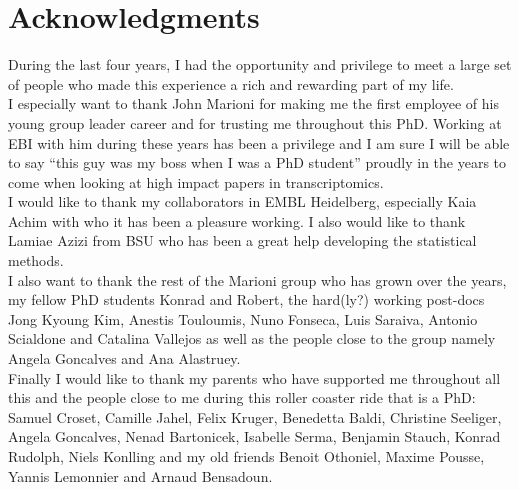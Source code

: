
\bigskip

\begingroup
\let\clearpage\relax
\let\cleardoublepage\relax
\let\cleardoublepage\relax
\chapter*{Acknowledgments}
During the last four years, I had the opportunity and privilege to meet a large set of people who made this experience a rich and rewarding part of my life.\\
I especially want to thank John Marioni for making me the first employee of his young group leader career and for trusting me throughout this PhD. Working at EBI with him during these years has been a privilege and I am sure I will be able to say ``this guy was my boss when I was a PhD student'' proudly in the years to come when looking at high impact papers in transcriptomics.\\

I would like to thank my collaborators in EMBL Heidelberg, especially Kaia Achim with who it has been a pleasure working. I also would like to thank Lamiae Azizi from BSU who has been a great help developing the statistical methods.\\

I also want to thank the rest of the Marioni group who has grown over the years, my fellow PhD students Konrad and Robert, the hard(ly?) working post-docs Jong Kyoung Kim, Anestis Touloumis, Nuno Fonseca, Luis Saraiva, Antonio Scialdone and Catalina Vallejos as well as the people close to the group namely Angela Goncalves and Ana Alastruey.\\

Finally I would like to thank my parents who have supported me throughout all this and the people close to me during this roller coaster ride that is a PhD: Samuel Croset, Camille Jahel, Felix Kruger, Benedetta Baldi, Christine Seeliger, Angela Goncalves, Nenad Bartonicek, Isabelle Serma, Benjamin Stauch, Konrad Rudolph, Niels Konlling and my old friends Benoit Othoniel, Maxime Pousse, Yannis Lemonnier and Arnaud Bensadoun.



\bigskip



\endgroup



